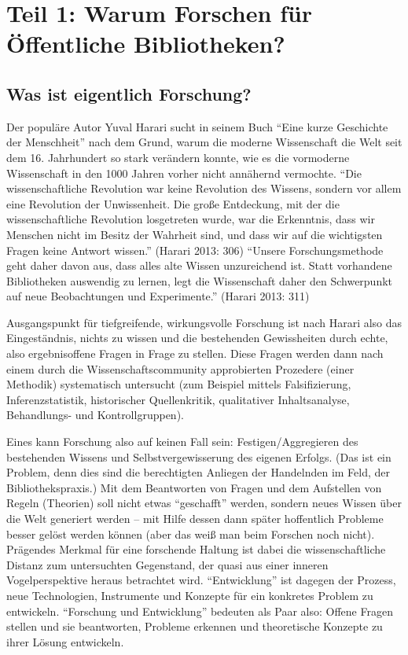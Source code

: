 \documentclass[a4paper,
fontsize=11pt,
oneside,
numbers=noperiodatend,
parskip=half-,
bibliography=totoc,
final
]{scrartcl}
\begin{document}
\hypertarget{teil-1-warum-forschen-fuxfcr-uxf6ffentliche-bibliotheken}{%
\section{Teil 1: Warum Forschen für Öffentliche
Bibliotheken?}\label{teil-1-warum-forschen-fuxfcr-uxf6ffentliche-bibliotheken}}

\hypertarget{was-ist-eigentlich-forschung}{%
\subsection{Was ist eigentlich
Forschung?}\label{was-ist-eigentlich-forschung}}

Der populäre Autor Yuval Harari sucht in seinem Buch \enquote{Eine kurze
Geschichte der Menschheit} nach dem Grund, warum die moderne
Wissenschaft die Welt seit dem 16. Jahrhundert so stark verändern
konnte, wie es die vormoderne Wissenschaft in den 1000 Jahren vorher
nicht annähernd vermochte. \enquote{Die wissenschaftliche Revolution war
keine Revolution des Wissens, sondern vor allem eine Revolution der
Unwissenheit. Die große Entdeckung, mit der die wissenschaftliche
Revolution losgetreten wurde, war die Erkenntnis, dass wir Menschen
nicht im Besitz der Wahrheit sind, und dass wir auf die wichtigsten
Fragen keine Antwort wissen.} (Harari 2013: 306) \enquote{Unsere
Forschungsmethode geht daher davon aus, dass alles alte Wissen
unzureichend ist. Statt vorhandene Bibliotheken auswendig zu lernen,
legt die Wissenschaft daher den Schwerpunkt auf neue Beobachtungen und
Experimente.} (Harari 2013: 311)

Ausgangspunkt für tiefgreifende, wirkungsvolle Forschung ist nach Harari
also das Eingeständnis, nichts zu wissen und die bestehenden
Gewissheiten durch echte, also ergebnisoffene Fragen in Frage zu
stellen. Diese Fragen werden dann nach einem durch die
Wissenschaftscommunity approbierten Prozedere (einer Methodik)
systematisch untersucht (zum Beispiel mittels Falsifizierung,
Inferenzstatistik, historischer Quellenkritik, qualitativer
Inhaltsanalyse, Behandlungs- und Kontrollgruppen).

Eines kann Forschung also auf keinen Fall sein: Festigen/Aggregieren des
bestehenden Wissens und Selbstvergewisserung des eigenen Erfolgs. (Das
ist ein Problem, denn dies sind die berechtigten Anliegen der Handelnden
im Feld, der Bibliothekspraxis.) Mit dem Beantworten von Fragen und dem
Aufstellen von Regeln (Theorien) soll nicht etwas \enquote{geschafft}
werden, sondern neues Wissen über die Welt generiert werden -- mit Hilfe
dessen dann später hoffentlich Probleme besser gelöst werden können
(aber das weiß man beim Forschen noch nicht). Prägendes Merkmal für eine
forschende Haltung ist dabei die wissenschaftliche Distanz zum
untersuchten Gegenstand, der quasi aus einer inneren Vogelperspektive
heraus betrachtet wird. \enquote{Entwicklung} ist dagegen der Prozess,
neue Technologien, Instrumente und Konzepte für ein konkretes Problem zu
entwickeln. \enquote{Forschung und Entwicklung} bedeuten als Paar also:
Offene Fragen stellen und sie beantworten, Probleme erkennen und
theoretische Konzepte zu ihrer Lösung entwickeln.
\end{document}
